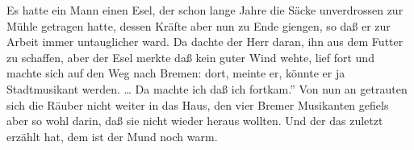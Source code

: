 \begin{flushleft}
Es hatte ein Mann einen Esel, der schon lange Jahre die Säcke unverdrossen zur Mühle getragen hatte, dessen Kräfte aber nun zu Ende giengen, so daß er zur Arbeit immer untauglicher ward. Da dachte der Herr daran, ihn aus dem Futter zu schaffen, aber der Esel merkte daß kein guter Wind wehte, lief fort und machte sich auf den Weg nach Bremen: dort, meinte er, könnte er ja Stadtmusikant werden.
\linebreak
\dots
\linebreak
Da machte ich daß ich fortkam.'' Von nun an getrauten sich die Räuber nicht weiter in das Haus, den vier Bremer Musikanten gefiels aber so wohl darin, daß sie nicht wieder heraus wollten. Und der das zuletzt erzählt hat, dem ist der Mund noch warm.
\end{flushleft}
